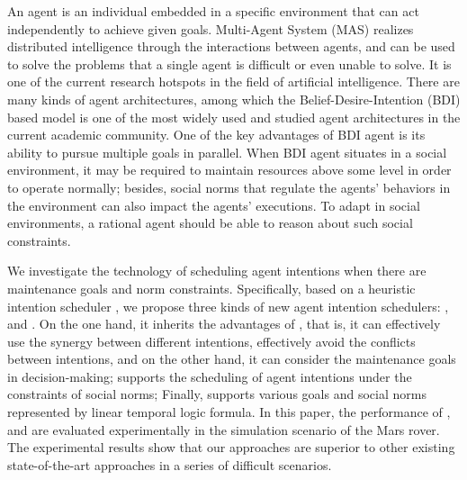 \begin{abstract*}
    An agent is an individual embedded in a specific environment that can act independently to achieve given goals. Multi-Agent System (MAS) realizes distributed intelligence through the interactions between agents, and can be used to solve the problems that a single agent is difficult or even unable to solve.
    It is one of the current research hotspots in the field of artificial intelligence. 
    There are many kinds of agent architectures, among which the Belief-Desire-Intention (BDI) based model is one of the most widely used and studied agent architectures in the current academic community.
    One of the key advantages of BDI agent is its ability to pursue multiple goals in parallel. When BDI agent situates in a social environment, it may be required to maintain resources above some level in order to operate normally; besides, social norms that regulate the agents' behaviors in the environment can also impact the agents' executions.
    To adapt in social environments, a rational agent should be able to reason about such social constraints.

    We investigate the technology of scheduling agent intentions when there are maintenance goals and norm constraints. 
    Specifically, based on a heuristic intention scheduler \SA, we propose three kinds of new agent intention schedulers: \SAM, \SAN and \SAT. 
    On the one hand, it inherits the advantages of \SA, that is, it can effectively use the synergy between different intentions, effectively avoid the conflicts between intentions, and on the other hand, it can consider the maintenance goals in decision-making; \SAN supports the scheduling of agent intentions under the constraints of social norms; Finally, \SAT supports various goals and social norms represented by linear temporal logic formula. 
    In this paper, the performance of \SAM, \SAN and \SAT are evaluated experimentally in the simulation scenario of the Mars rover. The experimental results show that our approaches are superior to other existing state-of-the-art approaches in a series of difficult scenarios.
\end{abstract*}
